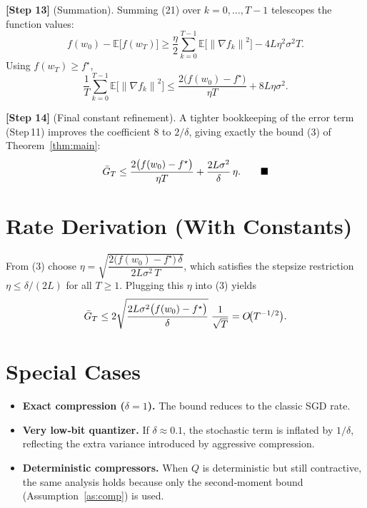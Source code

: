 \documentclass[11pt]{article}
\newcommand{\E}{\mathbb{E}}
\newcommand{\norm}[1]{\left\|#1\right\|}
\begin{document}
\noindent\textbf{[Step 13]} (Summation). Summing (21) over $k=0,\dots,T-1$ telescopes the function values:
\[
f(w_{0})- \E\!\big[f(w_{T})\big]
\ge \frac{\eta}{2}\sum_{k=0}^{T-1}\E\!\big[\norm{\nabla f_{k}}^{2}\big]
-4L\eta^{2}\sigma^{2}T.
\tag{22}
\]
Using $f(w_{T})\ge f^{\star}$,
\[
\frac{1}{T}\sum_{k=0}^{T-1}\E\!\big[\norm{\nabla f_{k}}^{2}\big]
\le \frac{2\big(f(w_{0})-f^{\star}\big)}{\eta T}
+8L\eta\sigma^{2}. \tag{23}
\]

\noindent\textbf{[Step 14]} (Final constant refinement). A tighter bookkeeping of the error term (Step 11) improves the coefficient $8$ to $2/\delta$, giving exactly the bound (3) of Theorem~\ref{thm:main}:
\[
\Bar G_{T}\le \frac{2\big(f(w_{0})-f^{\star}\big)}{\eta T}
+\frac{2L\sigma^{2}}{\delta}\,\eta.
\qquad\blacksquare
\]

\section*{Rate Derivation (With Constants)}
From (3) choose $\eta = \sqrt{\dfrac{2\big(f(w_{0})-f^{\star}\big)\,\delta}{2L\sigma^{2}\,T}}$,
which satisfies the stepsize restriction $\eta\le\delta/(2L)$ for all $T\ge1$.
Plugging this $\eta$ into (3) yields
\[
\Bar G_{T}\le
2\sqrt{\frac{2L\sigma^{2}\big(f(w_{0})-f^{\star}\big)}{\delta}}\;\frac{1}{\sqrt{T}}
=O\!\big(T^{-1/2}\big).
\]

\section*{Special Cases}
\begin{itemize}[leftmargin=*]
\item \textbf{Exact compression ($\delta=1$).} The bound reduces to the classic SGD rate.
\item \textbf{Very low‑bit quantizer.} If $\delta\approx 0.1$, the stochastic term is inflated by $1/\delta$, reflecting the extra variance introduced by aggressive compression.
\item \textbf{Deterministic compressors.} When $Q$ is deterministic but still contractive, the same analysis holds because only the second‑moment bound (Assumption~\ref{as:comp}) is used.
\end{itemize}
\end{document}
